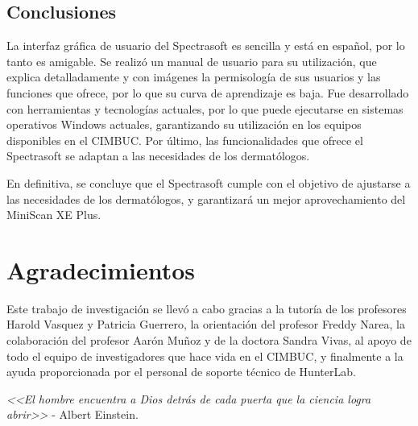 \documentclass[conference]{IEEEtran}
\begin{document}
	\subsection{Conclusiones}
	
	La interfaz gr\'{a}fica de usuario del Spectrasoft es sencilla y est\'{a} en espa\~{n}ol, por lo tanto es amigable. Se realiz\'{o} un manual de usuario para su utilizaci\'{o}n, que explica detalladamente y con im\'{a}genes la permisolog\'{i}a de sus usuarios y las funciones que ofrece, por lo que su curva de aprendizaje es baja. Fue desarrollado con herramientas y tecnolog\'{i}as actuales, por lo que puede ejecutarse en sistemas operativos Windows actuales, garantizando su utilizaci\'{o}n en los equipos disponibles en el CIMBUC. Por \'{u}ltimo, las funcionalidades que ofrece el Spectrasoft se adaptan a las necesidades de los dermat\'{o}logos.	

	En definitiva, se concluye que el Spectrasoft cumple con el objetivo de ajustarse a las necesidades de los dermat\'{o}logos, y garantizar\'{a} un mejor aprovechamiento del MiniScan XE Plus.

\section*{Agradecimientos}
	Este trabajo de investigaci\'{o}n se llev\'{o} a cabo gracias a la tutor\'{i}a de los profesores Harold Vasquez y Patricia \mbox{Guerrero}, la orientaci\'{o}n del profesor Freddy Narea, la colaboraci\'{o}n del profesor Aar\'{o}n Mu\~{n}oz y de la doctora Sandra Vivas, al apoyo de todo el equipo de investigadores que hace vida en el CIMBUC, y finalmente a la ayuda proporcionada por el personal de soporte t\'{e}cnico de HunterLab.
	
	\textit{<<El hombre encuentra a Dios detr\'{a}s de cada puerta que la ciencia logra abrir>>} - Albert Einstein.


\end{document}
